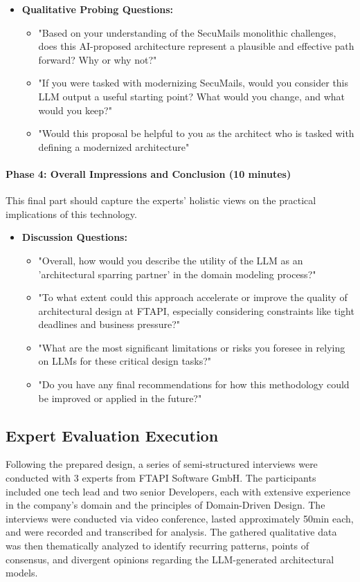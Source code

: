 \begin{itemize}
    \item \textbf{Qualitative Probing Questions:}
    \begin{itemize}
        \item "Based on your understanding of the SecuMails monolithic challenges, does this AI-proposed architecture represent a plausible and effective path forward? Why or why not?"
        \item "If you were tasked with modernizing SecuMails, would you consider this LLM output a useful starting point? What would you change, and what would you keep?"
        \item "Would this proposal be helpful to you as the architect who is tasked with defining a modernized architecture"
    \end{itemize}
\end{itemize}

\paragraph{Phase 4: Overall Impressions and Conclusion (10 minutes)}
This final part should capture the experts' holistic views on the practical implications of this technology.

\begin{itemize}
    \item \textbf{Discussion Questions:}
    \begin{itemize}
        \item "Overall, how would you describe the utility of the LLM as an 'architectural sparring partner' in the domain modeling process?"
        \item "To what extent could this approach accelerate or improve the quality of architectural design at FTAPI, especially considering constraints like tight deadlines and business pressure?"
        \item "What are the most significant limitations or risks you foresee in relying on LLMs for these critical design tasks?"
        \item "Do you have any final recommendations for how this methodology could be improved or applied in the future?"
    \end{itemize}
\end{itemize}

\subsection{Expert Evaluation Execution}
Following the prepared design, a series of semi-structured interviews were conducted with 3 experts from FTAPI Software GmbH. The participants included one tech lead and two senior Developers, each with extensive experience in the company's domain and the principles of Domain-Driven Design. The interviews were conducted via video conference, lasted approximately 50min each, and were recorded and transcribed for analysis. The gathered qualitative data was then thematically analyzed to identify recurring patterns, points of consensus, and divergent opinions regarding the LLM-generated architectural models.